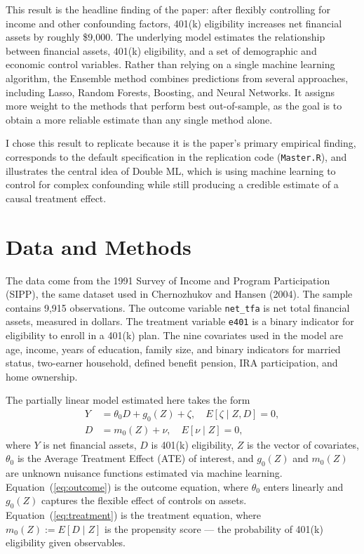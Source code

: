 \documentclass[12pt]{article}
\begin{document}
This result is the headline finding of the paper\@: after flexibly controlling
for income and other confounding factors, 401(k) eligibility increases net
financial assets by roughly \$9,000. The underlying model estimates the
relationship between financial assets, 401(k) eligibility, and a set of
demographic and economic control variables. Rather than relying on a single
machine learning algorithm, the Ensemble method combines predictions from
several approaches, including Lasso, Random Forests, Boosting, and Neural
Networks. It assigns more weight to the methods that perform best
out-of-sample, as the goal is to obtain a more reliable estimate than any
single method alone.

I chose this result to replicate because it is the paper's primary empirical
finding, corresponds to the default specification in the replication code
(\texttt{Master.R}), and illustrates the central idea of Double ML, which is
using machine learning to control for complex confounding while still
producing a credible estimate of a causal treatment effect.

\section{Data and Methods}

The data come from the 1991 Survey of Income and Program Participation
(SIPP), the same dataset used in Chernozhukov and Hansen (2004). The sample
contains 9,915 observations. The outcome variable \texttt{net\_tfa} is net
total financial assets, measured in dollars. The treatment variable
\texttt{e401} is a binary indicator for eligibility to enroll in a 401(k)
plan. The nine covariates used in the model are age, income, years of
education, family size, and binary indicators for married status,
two-earner household, defined benefit pension, IRA participation, and
home ownership.

The partially linear model estimated here takes the form
\begin{align}
    Y &= \theta_0 D + g_0(Z) + \zeta, \quad E[\zeta \mid Z, D] = 0,
        \label{eq:outcome} \\
    D &= m_0(Z) + \nu, \quad E[\nu \mid Z] = 0, \label{eq:treatment}
\end{align}
where $Y$ is net financial assets, $D$ is 401(k) eligibility, $Z$ is the
vector of covariates, $\theta_0$ is the Average Treatment Effect (ATE) of
interest, and $g_0(Z)$ and $m_0(Z)$ are unknown nuisance functions estimated
via machine learning. Equation~(\ref{eq:outcome}) is the outcome equation,
where $\theta_0$ enters linearly and $g_0(Z)$ captures the flexible effect of
controls on assets. Equation~(\ref{eq:treatment}) is the treatment equation,
where $m_0(Z) := E[D \mid Z]$ is the propensity score --- the probability of
401(k) eligibility given observables.
\end{document}
